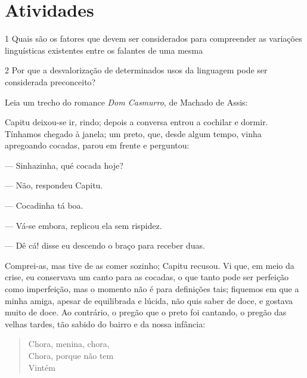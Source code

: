 {\section{Atividades}

\num{1} Quais são os fatores que devem ser considerados para compreender as
variações linguísticas existentes entre os falantes de uma mesma


\num{2} Por que a desvalorização de determinados usos da linguagem pode ser
considerada preconceito?


Leia um trecho do romance \textit{Dom Casmurro}, de Machado de Assis:

Capitu deixou-se ir, rindo; depois a conversa entrou a cochilar e
dormir. Tínhamos chegado à janela; um preto, que, desde algum
tempo, vinha apregoando cocadas, parou em frente e perguntou:

--- Sinhazinha, qué cocada hoje?

--- Não, respondeu Capitu.

--- Cocadinha tá boa.

--- Vá-se embora, replicou ela sem rispidez.

--- Dê cá! disse eu descendo o braço para receber duas.

Comprei-as, mas tive de as comer sozinho; Capitu recusou. Vi
que, em meio da crise, eu conservava um canto para as cocadas, o
que tanto pode ser perfeição como imperfeição, mas o momento
não é para definições tais; fiquemos em que a minha amiga,
apesar de equilibrada e lúcida, não quis saber de doce, e gostava
muito de doce. Ao contrário, o pregão que o preto foi cantando, o
pregão das velhas tardes, tão sabido do bairro e da nossa infância:



\begin{verse}
Chora, menina, chora, \\
Chora, porque não tem \\
Vintém
\end{verse}


}
